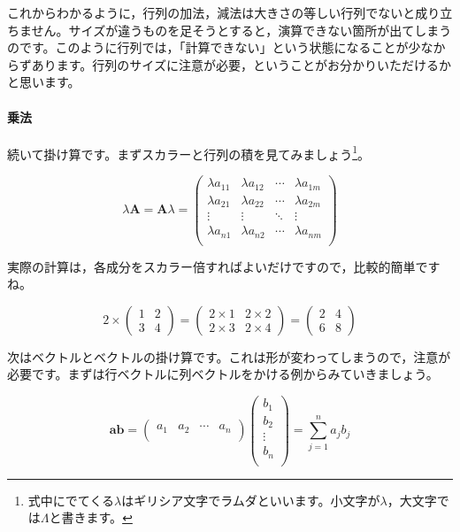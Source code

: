 \documentclass{ltjsbook}
\begin{document}
これからわかるように，行列の加法，減法は大きさの等しい行列でないと成り立ちません。サイズが違うものを足そうとすると，演算できない箇所が出てしまうのです。このように行列では，「計算できない」という状態になることが少なからずあります。行列のサイズに注意が必要，ということがお分かりいただけるかと思います。


\paragraph{乗法}
続いて掛け算です。まずスカラーと行列の積を見てみましょう\footnote{式中にでてくる$\lambda$はギリシア文字でラムダといいます。小文字が$\lambda$，大文字では$\Lambda$と書きます。}。

\begin{equation*}
    \lambda \bm{A} = \bm{A} \lambda =
    \begin{pmatrix}
        \lambda a_{11} & \lambda a_{12} & \cdots & \lambda a_{1m} \\
        \lambda a_{21} & \lambda a_{22} & \cdots & \lambda a_{2m} \\
        \vdots         & \vdots         & \ddots & \vdots         \\
        \lambda a_{n1} & \lambda a_{n2} & \cdots & \lambda a_{nm} \\
    \end{pmatrix}
\end{equation*}


実際の計算は，各成分をスカラー倍すればよいだけですので，比較的簡単ですね。

\begin{equation*}
    2 \times
    \begin{pmatrix}
        1 & 2 \\
        3 & 4
    \end{pmatrix}
    =
    \begin{pmatrix}
        2 \times 1 & 2 \times 2 \\
        2 \times 3 & 2 \times 4
    \end{pmatrix}
    =
    \begin{pmatrix}
        2 & 4 \\
        6 & 8
    \end{pmatrix}
\end{equation*}


次はベクトルとベクトルの掛け算です。これは形が変わってしまうので，注意が必要です。まずは行ベクトルに列ベクトルをかける例からみていきましょう。

\begin{equation*}
    \bm{a} \bm{b} =
    \begin{pmatrix}
        a_1 & a_2 & \cdots & a_n \\
    \end{pmatrix}
    \begin{pmatrix}
        b_1    \\
        b_2    \\
        \vdots \\
        b_n    \\
    \end{pmatrix}
    =
    \sum_{j=1}^{n} a_{j} b_{j}
\end{equation*}
\end{document}
